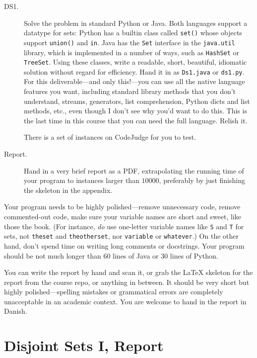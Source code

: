 \documentclass{tufte-handout}
\begin{document}
\begin{description}
  \item[DS1.]
    Solve the problem in standard Python or Java.
    Both languages support a datatype for sets:
    Python has a builtin class called \texttt{set()} whose objects support \texttt{union()} and \texttt{in}.
    Java has the \texttt{Set} interface in the \texttt{java.util} library, which is implemented in a number of ways, such as \texttt{HashSet} or \texttt{TreeSet}.
    Using these classes, write a readable, short, beautiful, idiomatic solution without regard for efficiency.
    Hand it in as \texttt{Ds1.java} or \texttt{ds1.py}.
    For this deliverable---and only this!---you can use all the native language features you want, including standard library methods that you don't understand, streams, generators, list comprehension, Python dicts and list methods, etc., even though I don't see why you'd want to do this.
    This is the last time in this course that you can need the full language.
    Relish it.
    
    There is a set of instances on CodeJudge for you to test.
  \item[Report.]
    Hand in a very brief report as a PDF, extrapolating the running time of your program to instances larger than $10000$, preferably by just finishing the skeleton in the appendix. 
\end{description}

Your program needs to be highly polished---remove unnecessary code, remove commented-out code, make sure your variable names are short and sweet, like those the book.
(For instance, \emph{do} use one-letter variable names like \texttt{S} and \texttt{T} for sets, not \texttt{theset} and \texttt{theotherset}, nor \texttt{variable} or \texttt{whatever}.)
On the other hand, don't spend time on writing long comments or docstrings.
Your program should be not much longer than 60 lines of Java or 30 lines of Python.


You can write the report by hand and scan it, or grab the LaTeX skeleton for the report from the course repo, or anything in between.
It should be very short but highly polished---spelling mistakes or grammatical errors are completely unacceptable in an academic context.
You are welcome to hand in the report in Danish.

\newpage
\section{Disjoint Sets I, Report}
\end{document}
